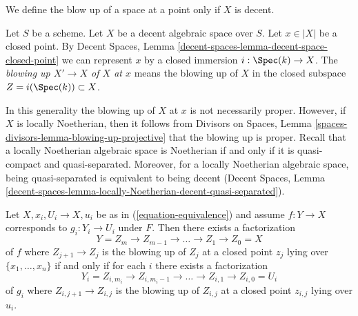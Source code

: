 \noindent
We define the blow up of a space at a point only if $X$ is decent.

\begin{definition}
\label{definition-blowup-at-point}
Let $S$ be a scheme. Let $X$ be a decent algebraic space over $S$.
Let $x \in |X|$ be a closed point. By
Decent Spaces, Lemma \ref{decent-spaces-lemma-decent-space-closed-point}
we can represent $x$ by a closed immersion $i : \Spec(k) \to X$.
The {\it blowing up $X' \to X$ of $X$ at $x$} means the blowing up of $X$
in the closed subspace $Z = i(\Spec(k)) \subset X$.
\end{definition}

\noindent
In this generality the blowing up of $X$ at $x$ is not necessarily proper.
However, if $X$ is locally Noetherian, then it follows from
Divisors on Spaces, Lemma \ref{spaces-divisors-lemma-blowing-up-projective}
that the blowing up is proper.
Recall that a locally Noetherian algebraic space is Noetherian if
and only if it is quasi-compact and quasi-separated. Moreover, for
a locally Noetherian algebraic space, being quasi-separated is
equivalent to being decent (Decent Spaces, Lemma
\ref{decent-spaces-lemma-locally-Noetherian-decent-quasi-separated}).

\begin{lemma}
\label{lemma-equivalence-sequence-blowups}
Let $X, x_i, U_i \to X, u_i$ be as in (\ref{equation-equivalence})
and assume $f : Y \to X$ corresponds to $g_i : Y_i \to U_i$ under $F$.
Then there exists a factorization
$$
Y = Z_m \to Z_{m - 1} \to \ldots \to Z_1 \to Z_0 = X
$$
of $f$ where $Z_{j + 1} \to Z_j$ is the blowing up of $Z_j$ at a closed
point $z_j$ lying over $\{x_1, \ldots, x_n\}$ if and only if for each
$i$ there exists a factorization
$$
Y_i = Z_{i, m_i} \to Z_{i, m_i - 1} \to \ldots \to Z_{i, 1} \to Z_{i, 0} = U_i
$$
of $g_i$ where $Z_{i, j + 1} \to Z_{i, j}$ is the blowing up of $Z_{i, j}$
at a closed point $z_{i, j}$ lying over $u_i$.
\end{lemma}

